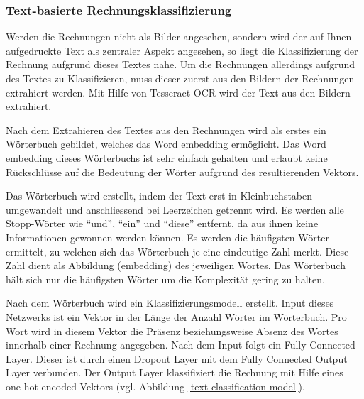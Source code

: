 \subsubsection{Text-basierte Rechnungsklassifizierung}
\label{chap:text-based-classification}


Werden die Rechnungen nicht als Bilder angesehen, sondern wird der auf Ihnen aufgedruckte Text als zentraler Aspekt angesehen, so liegt die Klassifizierung der Rechnung aufgrund dieses Textes nahe. Um die Rechnungen allerdings aufgrund des Textes zu Klassifizieren, muss dieser zuerst aus den Bildern der Rechnungen extrahiert werden. Mit Hilfe von Tesseract OCR wird der Text aus den Bildern extrahiert.

Nach dem Extrahieren des Textes aus den Rechnungen wird als erstes ein Wörterbuch gebildet, welches das Word embedding ermöglicht. Das Word embedding dieses Wörterbuchs ist sehr einfach gehalten und erlaubt keine Rückschlüsse auf die Bedeutung der Wörter aufgrund des resultierenden Vektors.

Das Wörterbuch wird erstellt, indem der Text erst in Kleinbuchstaben umgewandelt und anschliessend bei Leerzeichen getrennt wird. Es werden alle Stopp-Wörter wie \enquote{und}, \enquote{ein} und \enquote{diese} entfernt, da aus ihnen keine Informationen gewonnen werden können. Es werden die häufigsten Wörter ermittelt, zu welchen sich das Wörterbuch je eine eindeutige Zahl merkt. Diese Zahl dient als Abbildung (embedding) des jeweiligen Wortes. Das Wörterbuch hält sich nur die häufigsten Wörter um die Komplexität gering zu halten.

Nach dem Wörterbuch wird ein Klassifizierungsmodell erstellt. Input dieses Netzwerks ist ein Vektor in der Länge der Anzahl Wörter im Wörterbuch. Pro Wort wird in diesem Vektor die Präsenz beziehungsweise Absenz des Wortes innerhalb einer Rechnung angegeben. Nach dem Input folgt ein Fully Connected Layer. Dieser ist durch einen Dropout Layer mit dem Fully Connected Output Layer verbunden. Der Output Layer klassifiziert die Rechnung mit Hilfe eines one-hot encoded Vektors (vgl. Abbildung \ref{text-classification-model}). 

